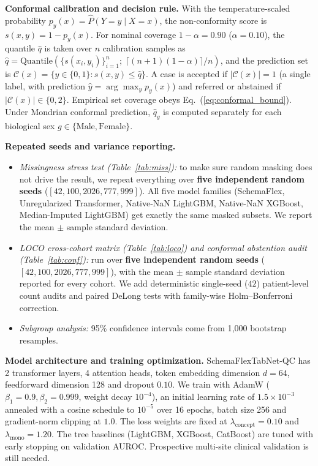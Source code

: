 \documentclass[conference]{IEEEtran}
\newcommand{\sfn}{SchemaFlexTabNet-QC}
\begin{document}
\textbf{Conformal calibration and decision rule.} With the temperature-scaled probability $p_y(x) = \hat{P}(Y=y \mid X=x)$, the non-conformity score is $s(x,y)=1-p_y(x)$. For nominal coverage $1-\alpha=0.90$ ($\alpha=0.10$), the quantile $\hat{q}$ is taken over $n$ calibration samples as $\hat{q} = \mathrm{Quantile}(\{s(x_i,y_i)\}_{i=1}^n; \; \lceil (n+1)(1-\alpha) \rceil / n)$, and the prediction set is $\mathcal{C}(x) = \{y \in \{0,1\} : s(x,y) \le \hat{q}\}$. A case is accepted if $|\mathcal{C}(x)|=1$ (a single label, with prediction $\hat{y}=\arg\max_y p_y(x)$) and referred or abstained if $|\mathcal{C}(x)|\in\{0,2\}$. Empirical set coverage obeys Eq.~(\ref{eq:conformal_bound}). Under Mondrian conformal prediction, $\hat{q}_g$ is computed separately for each biological sex $g\in\{\mathrm{Male},\mathrm{Female}\}$.

\textbf{Repeated seeds and variance reporting.}
\begin{itemize}
\item \emph{Missingness stress test (Table~\ref{tab:miss}):} to make sure random masking does not drive the result, we repeat everything over \textbf{five independent random seeds} ($[42, 100, 2026, 777, 999]$). All five model families (SchemaFlex, Unregularized Transformer, Native-NaN LightGBM, Native-NaN XGBoost, Median-Imputed LightGBM) get exactly the same masked subsets. We report the mean $\pm$ sample standard deviation.
\item \emph{LOCO cross-cohort matrix (Table~\ref{tab:loco}) and conformal abstention audit (Table~\ref{tab:conf}):} run over \textbf{five independent random seeds} ($[42, 100, 2026, 777, 999]$), with the mean $\pm$ sample standard deviation reported for every cohort. We add deterministic single-seed ($42$) patient-level count audits and paired DeLong tests with family-wise Holm--Bonferroni correction.
\item \emph{Subgroup analysis:} 95\% confidence intervals come from 1{,}000 bootstrap resamples.
\end{itemize}

\textbf{Model architecture and training optimization.} \sfn{} has 2 transformer layers, 4 attention heads, token embedding dimension $d=64$, feedforward dimension 128 and dropout $0.10$. We train with AdamW ($\beta_1=0.9, \beta_2=0.999$, weight decay $10^{-4}$), an initial learning rate of $1.5\times 10^{-3}$ annealed with a cosine schedule to $10^{-5}$ over 16 epochs, batch size 256 and gradient-norm clipping at $1.0$. The loss weights are fixed at $\lambda_{\mathrm{concept}}=0.10$ and $\lambda_{\mathrm{mono}}=1.20$. The tree baselines (LightGBM, XGBoost, CatBoost) are tuned with early stopping on validation AUROC. Prospective multi-site clinical validation is still needed.
\end{document}
